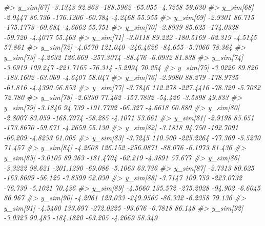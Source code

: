 \documentclass[
  10pt,
  italian,
  a4paper,
  extrafontsizes,onecolumn,openright
  ]{memoir}
\newenvironment{Shaded}{\begin{snugshade}}{\end{snugshade}}
\newcommand{\CommentTok}[1]{\textcolor[rgb]{0.56,0.35,0.01}{\textit{#1}}}
\begin{document}
\begin{Shaded}
\begin{Highlighting}[]
\CommentTok{\#\textgreater{}   y\_sim[67]  {-}3.1343  92.863 {-}188.5962 {-}65.055 {-}4.7258 59.630}
\CommentTok{\#\textgreater{}   y\_sim[68]  {-}2.9447  86.736 {-}176.1206 {-}60.784 {-}4.2468 55.955}
\CommentTok{\#\textgreater{}   y\_sim[69]  {-}2.9301  86.715 {-}175.1773 {-}60.684 {-}4.6662 55.751}
\CommentTok{\#\textgreater{}   y\_sim[70]  {-}2.8939  85.625 {-}174.0328 {-}59.720 {-}4.4077 55.463}
\CommentTok{\#\textgreater{}   y\_sim[71]  {-}3.0118  89.222 {-}180.5169 {-}62.319 {-}4.5145 57.861}
\CommentTok{\#\textgreater{}   y\_sim[72]  {-}4.0570 121.040 {-}246.4626 {-}84.655 {-}5.7066 78.364}
\CommentTok{\#\textgreater{}   y\_sim[73]  {-}4.2632 126.669 {-}257.3074 {-}88.476 {-}6.0932 81.838}
\CommentTok{\#\textgreater{}   y\_sim[74]  {-}3.6919 109.247 {-}221.7165 {-}76.314 {-}5.2994 70.254}
\CommentTok{\#\textgreater{}   y\_sim[75]  {-}3.0226  89.826 {-}183.1602 {-}63.069 {-}4.6407 58.047}
\CommentTok{\#\textgreater{}   y\_sim[76]  {-}2.9980  88.279 {-}178.9735 {-}61.816 {-}4.4390 56.853}
\CommentTok{\#\textgreater{}   y\_sim[77]  {-}3.7846 112.278 {-}227.4416 {-}78.320 {-}5.7082 72.780}
\CommentTok{\#\textgreater{}   y\_sim[78]  {-}2.6330  77.462 {-}157.7832 {-}54.426 {-}3.5898 49.833}
\CommentTok{\#\textgreater{}   y\_sim[79]  {-}3.1846  94.739 {-}191.7792 {-}66.327 {-}4.6618 60.880}
\CommentTok{\#\textgreater{}   y\_sim[80]  {-}2.8007  83.059 {-}168.7074 {-}58.285 {-}4.1071 53.661}
\CommentTok{\#\textgreater{}   y\_sim[81]  {-}2.9198  85.651 {-}173.8670 {-}59.671 {-}4.2659 55.130}
\CommentTok{\#\textgreater{}   y\_sim[82]  {-}3.1818  94.750 {-}192.7091 {-}66.209 {-}4.8253 61.005}
\CommentTok{\#\textgreater{}   y\_sim[83]  {-}3.7245 110.500 {-}225.2264 {-}77.369 {-}5.5230 71.457}
\CommentTok{\#\textgreater{}   y\_sim[84]  {-}4.2608 126.152 {-}256.0871 {-}88.076 {-}6.1973 81.436}
\CommentTok{\#\textgreater{}   y\_sim[85]  {-}3.0105  89.363 {-}181.4704 {-}62.219 {-}4.3891 57.677}
\CommentTok{\#\textgreater{}   y\_sim[86]  {-}3.3222  98.621 {-}201.1290 {-}69.086 {-}5.1063 63.736}
\CommentTok{\#\textgreater{}   y\_sim[87]  {-}2.7313  80.625 {-}163.8699 {-}56.125 {-}3.8599 52.030}
\CommentTok{\#\textgreater{}   y\_sim[88]  {-}3.7147 109.759 {-}223.0732 {-}76.739 {-}5.1021 70.436}
\CommentTok{\#\textgreater{}   y\_sim[89]  {-}4.5660 135.572 {-}275.2028 {-}94.902 {-}6.6045 86.967}
\CommentTok{\#\textgreater{}   y\_sim[90]  {-}4.2061 123.033 {-}249.9565 {-}86.332 {-}6.2358 79.136}
\CommentTok{\#\textgreater{}   y\_sim[91]  {-}4.5460 133.697 {-}272.0225 {-}93.676 {-}6.7818 86.148}
\CommentTok{\#\textgreater{}   y\_sim[92]  {-}3.0323  90.483 {-}184.1820 {-}63.205 {-}4.2669 58.349}

\end{Highlighting}
\end{Shaded}
\end{document}
